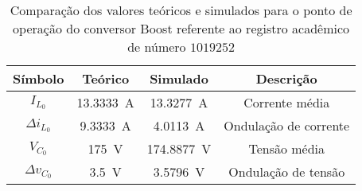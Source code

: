 \begin{table}[!ht]
\centering
\caption{Comparação dos valores teóricos e simulados para o ponto de operação do conversor Boost referente ao registro acadêmico de número $1019252$}
\label{tab:steadystatesim}
\begin{tabular}{@{}cccc@{}}
\toprule
\textbf{Símbolo} & \textbf{Teórico} & \textbf{Simulado} & \textbf{Descrição}\\ \midrule
$I_{L_0}$ & \SI{13.3333}{\A} & \SI{13.3277}{\A} & Corrente média\\
$\Delta{i_{L_0}}$  & \SI{9.3333}{\A} & \SI{4.0113}{\A}& Ondulação de corrente\\
$V_{C_0}$ & \SI{175}{\V} & \SI{174.8877}{\V} & Tensão média\\
$\Delta{v_{C_0}}$  & \SI{3.5}{\V} & \SI{3.5796}{\V}& Ondulação de tensão \\
\bottomrule
\end{tabular}
\end{table}


